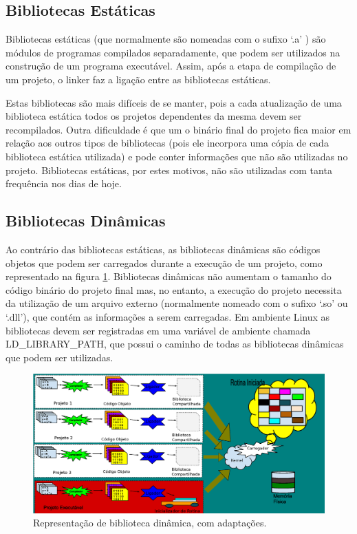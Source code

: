 \subsection{Bibliotecas Estáticas}

Bibliotecas estáticas (que normalmente  são nomeadas com o  sufixo ‘.a’ ) 
são módulos de programas compilados separadamente, que podem ser utilizados
 na construção de um programa executável. Assim, após a etapa de compilação de
 um projeto, o linker faz a ligação entre as bibliotecas estáticas\cite{ref39}.

Estas bibliotecas são mais difíceis de se manter, pois a cada atualização de uma
 biblioteca estática todos os projetos dependentes da mesma devem ser recompilados.
 Outra dificuldade é que um o binário final do projeto fica maior em relação aos
 outros tipos de bibliotecas (pois ele incorpora uma cópia de cada biblioteca
 estática utilizada) e pode conter informações que não são utilizadas no projeto.
 Bibliotecas estáticas, por estes motivos, não são utilizadas com tanta
 frequência nos dias de hoje.


\subsection{Bibliotecas Dinâmicas}

Ao contrário das bibliotecas estáticas, as bibliotecas dinâmicas são códigos
 objetos que podem ser carregados durante a execução de um projeto, como
 representado na figura \ref{fig06}. Bibliotecas dinâmicas não aumentam
 o tamanho do código binário do projeto final mas, no entanto, a execução
 do projeto necessita da utilização de um arquivo externo (normalmente
 nomeado com o sufixo ‘.so’ ou ‘.dll’), que contém as informações a serem
 carregadas\cite{Lasca2}. Em ambiente Linux as bibliotecas devem ser 
 registradas em uma variável de ambiente chamada LD\_LIBRARY\_PATH, 
 que possui o caminho de todas as bibliotecas dinâmicas que podem ser 
 utilizadas.

\begin{figure}[h]
    \centering
    \label{fig06}
        \includegraphics[keepaspectratio=true,scale=0.3]{figuras/dynamic_lib.eps}
    \caption{ Representação de biblioteca dinâmica, com adaptações\cite{ref41}.}
\end{figure}


